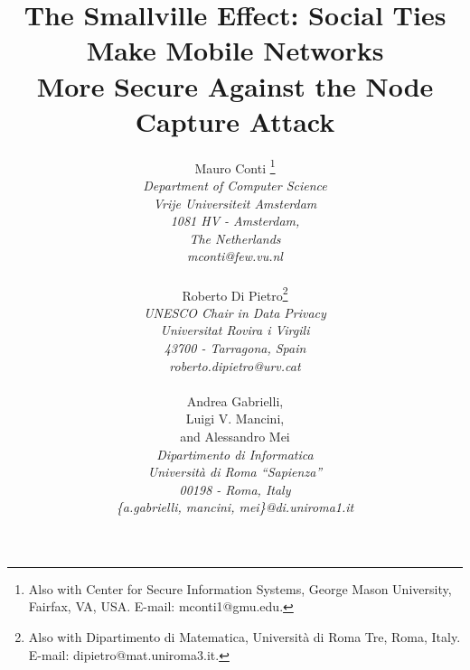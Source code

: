 \documentclass{IEEEconf}
\begin{document}
\title{The Smallville Effect: Social Ties Make Mobile Networks\\ More Secure Against the Node Capture Attack}


\author{
\normalsize
         \parbox{2 in}{\centering Mauro Conti   \thanks{Also with Center for Secure Information Systems, George Mason University, Fairfax, VA, USA. E-mail: mconti1@gmu.edu.}
         \\
\emph{Department of Computer Science}\\
         \emph{Vrije Universiteit Amsterdam}\\
\emph{1081 HV - Amsterdam, \\The Netherlands}\\
        \emph{mconti@few.vu.nl}\\
        }
         \hspace*{ 0.1 in}
         \parbox{2 in}{ \centering Roberto Di Pietro\thanks{Also with Dipartimento di Matematica, Universit\`a di Roma Tre, Roma, Italy. E-mail: dipietro@mat.uniroma3.it.}         \\
\emph{UNESCO Chair in Data Privacy}\\
        \emph{Universitat Rovira i Virgili}\\
        \emph{43700 - Tarragona, Spain}\\
        \emph{roberto.dipietro@urv.cat}\\
}
         \hspace*{ 0.1 in}
         \parbox{2.2 in}{ \centering Andrea Gabrielli,\\ Luigi V. Mancini, \\and Alessandro Mei\\
\emph{Dipartimento di Informatica}\\
         \emph{Universit\`a di Roma ``Sapienza'' }\\
\emph{00198 - Roma, Italy}\\
        \emph{\{a.gabrielli, mancini, mei\}@di.uniroma1.it}\\
        }
}


\maketitle
\end{document}
